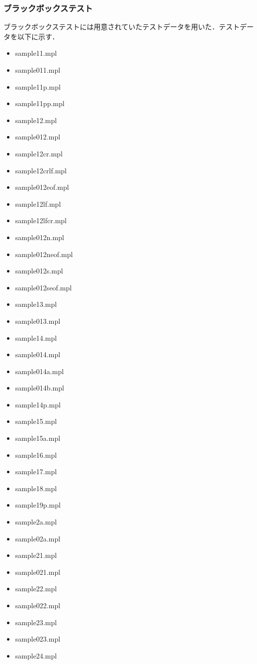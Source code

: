 \documentclass{jlreq}
\begin{document}
\subsubsection{ブラックボックステスト}
ブラックボックステストには用意されていたテストデータを用いた．テストデータを以下に示す．
\begin{itemize}
  \item sample11.mpl
  \item sample011.mpl
  \item sample11p.mpl
  \item sample11pp.mpl
  \item sample12.mpl
  \item sample012.mpl
  \item sample12cr.mpl
  \item sample12crlf.mpl
  \item sample012eof.mpl
  \item sample12lf.mpl
  \item sample12lfcr.mpl
  \item sample012n.mpl
  \item sample012neof.mpl
  \item sample012s.mpl
  \item sample012seof.mpl
  \item sample13.mpl
  \item sample013.mpl
  \item sample14.mpl
  \item sample014.mpl
  \item sample014a.mpl
  \item sample014b.mpl
  \item sample14p.mpl
  \item sample15.mpl
  \item sample15a.mpl
  \item sample16.mpl
  \item sample17.mpl
  \item sample18.mpl
  \item sample19p.mpl
  \item sample2a.mpl
  \item sample02a.mpl
  \item sample21.mpl
  \item sample021.mpl
  \item sample22.mpl
  \item sample022.mpl
  \item sample23.mpl
  \item sample023.mpl
  \item sample24.mpl

\end{itemize}
\end{document}
